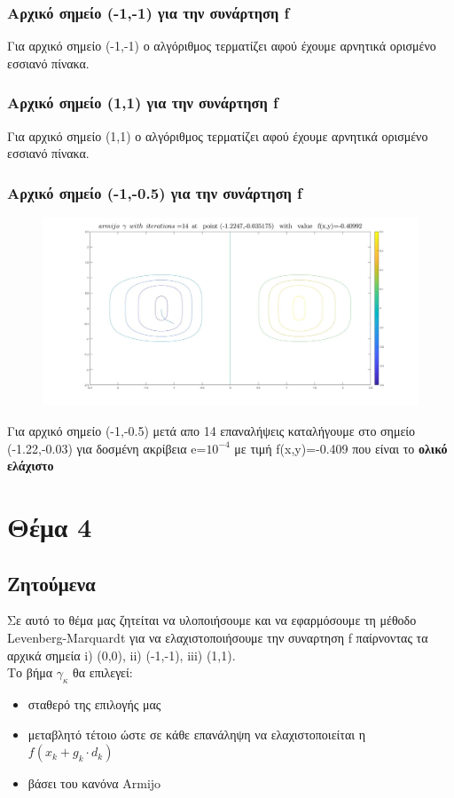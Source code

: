 \documentclass{article}
\begin{document}
\subsubsection*{Αρχικό σημείο (-1,-1) για την συνάρτηση f}
Για αρχικό σημείο (-1,-1) ο αλγόριθμος τερματίζει αφού έχουμε αρνητικά ορισμένο εσσιανό πίνακα. 
 
\subsubsection*{Αρχικό σημείο (1,1) για την συνάρτηση f}
  
Για αρχικό σημείο (1,1) ο αλγόριθμος τερματίζει αφού έχουμε αρνητικά ορισμένο εσσιανό πίνακα. 
\clearpage
\subsubsection*{Αρχικό σημείο (-1,-0.5) για την συνάρτηση f}
\begin{figure}[h!]	
     \centering  
     \advance\leftskip-0.2cm    \includegraphics[width=140mm,scale=2]{armmin2.jpg}
\end{figure} 
Για αρχικό σημείο (-1,-0.5) μετά απο 14 επαναλήψεις καταλήγουμε στο σημείο (-1.22,-0.03) για  δοσμένη ακρίβεια e=$10^{-4}$ με τιμή f(x,y)=-0.409 που είναι  το \textbf{ολικό ελάχιστο} \clearpage
\section*{Θέμα 4}
\subsection*{Ζητούμενα}
Σε αυτό το θέμα μας ζητείται να υλοποιήσουμε και να εφαρμόσουμε τη μέθοδο Levenberg-Marquardt για να ελαχιστοποιήσουμε την συναρτηση f  παίρνοντας τα αρχικά σημεία i) (0,0), ii) (-1,-1), iii) (1,1).\\Το βήμα $γ_κ$ θα επιλεγεί:
\begin{itemize}
\item σταθερό της επιλογής μας
\item μεταβλητό τέτοιο ώστε σε κάθε επανάληψη να ελαχιστοποιείται η $f(x_k+g_k \cdot d_k )$ 
\item  βάσει του κανόνα Armijo
\end{itemize}
\end{document}
